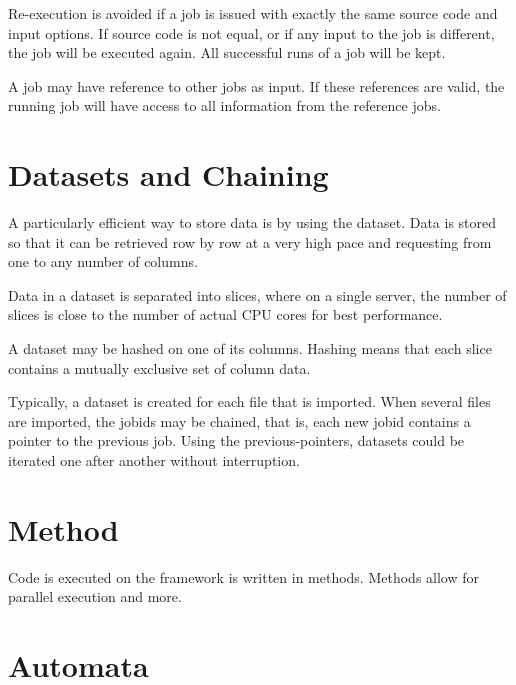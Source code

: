Re-execution is avoided if a job is issued with exactly the same
source code and input options.  If source code is not equal, or if any
input to the job is different, the job will be executed again.  All
successful runs of a job will be kept.

A job may have reference to other jobs as input.  If these references
are valid, the running job will have access to all information from
the reference jobs.



\section{Datasets and Chaining}

A particularly efficient way to store data is by using the dataset.
Data is stored so that it can be retrieved row by row at a very high
pace and requesting from one to any number of columns.

Data in a dataset is separated into slices, where on a single server,
the number of slices is close to the number of actual CPU cores for
best performance.

A dataset may be hashed on one of its columns.  Hashing means that
each slice contains a mutually exclusive set of column data.

Typically, a dataset is created for each file that is imported.  When
several files are imported, the jobids may be chained, that is, each
new jobid contains a pointer to the previous job.  Using the
previous-pointers, datasets could be iterated one after another
without interruption.



\section{Method}

Code is executed on the framework is written in methods.  Methods
allow for parallel execution and more.

\section{Automata}

